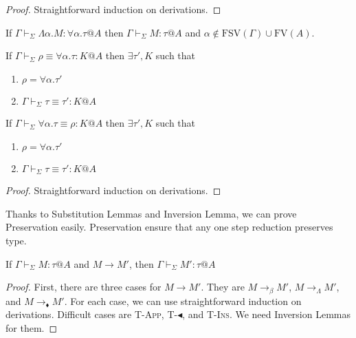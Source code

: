 \documentclass[runningheads]{llncs}
\newcommand{\G}{\Gamma}
\newcommand{\V}{\vdash_\Sigma}
\newcommand{\TBL}{\blacktriangleleft}
\newcommand{\E}{\equiv}
\newcommand{\FV}{\text{FV}}
\newcommand{\FTV}{\text{FSV}}
\newcommand{\TApp}{\textsc{T-App}}
\newcommand{\TTBL}{\textsc{T-$\TBL$}}
\newcommand{\TIns}{\textsc{T-Ins}}
\begin{document}
  \begin{proof}
      Straightforward induction on derivations.
  \end{proof}

  \begin{theorem}
      \begin{item}
      \item If $\G \V \Lambda\alpha.M : \forall\alpha.\tau @A$ then $\G \V M : \tau @A$ and $\alpha \notin \FTV(\G) \cup \FV(A)$.
      \item If $\G \V \rho \E \forall\alpha.\tau : K @A$ then $\exists \tau', K$ such that
          \begin{enumerate}
              \item $\rho = \forall\alpha.\tau'$
              \item $\G \V \tau \E \tau' : K @A$
          \end{enumerate}
      \item If $\G \V \forall\alpha.\tau \E \rho : K @A$ then $\exists \tau', K$ such that
          \begin{enumerate}
              \item $\rho = \forall\alpha.\tau'$
              \item $\G \V \tau \E \tau' : K @A$
          \end{enumerate}
      \end{item}
  \end{theorem}

  \begin{proof}
      Straightforward induction on derivations.
  \end{proof}


  Thanks to Substitution Lemmas and Inversion Lemma, we can prove Preservation easily.
  Preservation ensure that any one step reduction preserves type.

  \begin{theorem}[Preservation]
      If $\G\V M:\tau @A$ and $M \longrightarrow M'$, then $\G\V M':\tau @A$\\
  \end{theorem}

  \begin{proof}
      First, there are three cases for $M \longrightarrow M'$.
      They are $M \longrightarrow_\beta M'$, $M \longrightarrow_\Lambda M'$, and $M \longrightarrow_\blacklozenge M'$.
      For each case, we can use straightforward induction on derivations.
      Difficult cases are \TApp, \TTBL, and \TIns.
      We need Inversion Lemmas for them.
  \end{proof}
\end{document}
